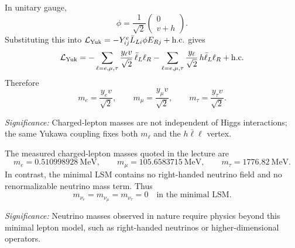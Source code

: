 In unitary gauge,
\begin{equation}
  \phi=\frac{1}{\sqrt2}\begin{pmatrix}0\\ v+h\end{pmatrix} .
  \label{eq:lec18:unitary-doublet-again}
\end{equation}
Substituting this into
$\mathcal{L}_{\rm Yuk}=-Y^e_{ij}\bar L_{Li}\phi E_{Rj}+\mathrm{h.c.}$ gives
\begin{equation}
  \mathcal{L}_{\rm Yuk}
  =-\sum_{\ell=e,\mu,\tau}\frac{y_\ell v}{\sqrt2}\,\bar\ell_L\ell_R
   -\sum_{\ell=e,\mu,\tau}\frac{y_\ell}{\sqrt2}\,h\bar\ell_L\ell_R
   +\mathrm{h.c.}
  \label{eq:lec18:yukawa-expanded}
\end{equation}
Therefore
\begin{equation}
  \boxed{\;m_e=\frac{y_ev}{\sqrt2},
  \qquad
  m_\mu=\frac{y_\mu v}{\sqrt2},
  \qquad
  m_\tau=\frac{y_\tau v}{\sqrt2}.\;}
  \label{eq:lec18:charged-lepton-masses}
\end{equation}

\textit{Significance:} Charged-lepton masses are not independent of Higgs interactions; the same Yukawa coupling fixes both $m_\ell$ and the $h\bar\ell\ell$ vertex.

The measured charged-lepton masses quoted in the lecture are
\begin{equation}
  m_e=0.510998928\ \mathrm{MeV},
  \qquad
  m_\mu=105.6583715\ \mathrm{MeV},
  \qquad
  m_\tau=1776.82\ \mathrm{MeV} .
  \label{eq:lec18:measured-lepton-masses}
\end{equation}
In contrast, the minimal LSM contains no right-handed neutrino field and no
renormalizable neutrino mass term. Thus
\begin{equation}
  \boxed{\;m_{\nu_e}=m_{\nu_\mu}=m_{\nu_\tau}=0\quad\text{in the minimal LSM}.\;}
  \label{eq:lec18:neutrinos-massless}
\end{equation}

\textit{Significance:} Neutrino masses observed in nature require physics beyond this minimal lepton model, such as right-handed neutrinos or higher-dimensional operators.


